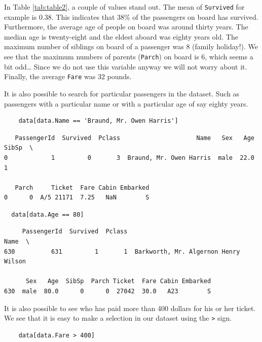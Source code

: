 \documentclass[11pt]{article}
\begin{document}
In Table \ref{tab:table2}, a couple of values stand out. The mean of \texttt{Survived} for example is 0.38. This indicates that 38\% of the passengers on board has survived. Furthermore, the average age of people on board was around thirty years. The median age is twenty-eight and the eldest aboard was eighty years old. The maximum number of siblings on board of a passenger was 8 (family holiday!). We see that the maximum numbers of parents (\texttt{Parch}) on board is 6, which seems a bit odd\ldots{} Since we do not use this variable anyway we will not worry about it. Finally, the average \texttt{Fare} was 32 pounds. 

It is also possible to search for particular passengers in the dataset. Such as passengers with a particular name or with a particular age of say eighty years. 

\begin{verbatim}
    data[data.Name == 'Braund, Mr. Owen Harris']
\end{verbatim}

\begin{verbatim}
   PassengerId  Survived  Pclass                     Name   Sex   Age  SibSp  \
0            1         0       3  Braund, Mr. Owen Harris  male  22.0      1   

   Parch     Ticket  Fare Cabin Embarked  
0      0  A/5 21171  7.25   NaN        S  
\end{verbatim}

\begin{verbatim}
  data[data.Age == 80]
\end{verbatim}

\begin{verbatim}
     PassengerId  Survived  Pclass                                  Name  \
630          631         1       1  Barkworth, Mr. Algernon Henry Wilson   

      Sex   Age  SibSp  Parch Ticket  Fare Cabin Embarked  
630  male  80.0      0      0  27042  30.0   A23        S  
\end{verbatim}

It is also possible to see who has paid more than 400 dollars for his or her ticket. We see that it is easy to make a selection in our dataset using the \texttt{>} sign.

\begin{verbatim}
    data[data.Fare > 400]
\end{verbatim}
\end{document}
